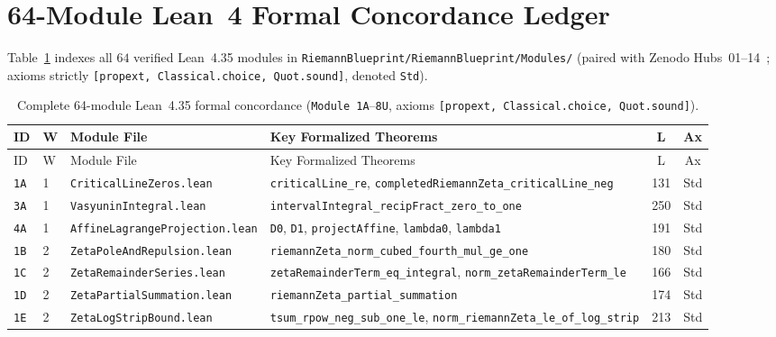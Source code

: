 \documentclass[11pt,a4paper]{article}
\theoremstyle{definition}
\begin{document}
\section{64-Module Lean~4 Formal Concordance Ledger}\label{sec:ledger}

Table~\ref{tab:52_modules} indexes all $64$ verified Lean~4.35 modules in \texttt{RiemannBlueprint/\allowbreak RiemannBlueprint/\allowbreak Modules/} (paired with Zenodo Hubs~01--14~\cite{MunawerRiemannBlueprint2026}; axioms strictly \texttt{[propext, Classical.choice, Quot.sound]}, denoted \texttt{Std}).

\scriptsize
\setlength{\tabcolsep}{3.5pt}
\begin{longtable}{@{}ll>{\raggedright\arraybackslash}p{5.2cm}>{\raggedright\arraybackslash}p{6.8cm}cc@{}}
\caption{Complete 64-module Lean~4.35 formal concordance (\texttt{Module~1A}--\texttt{8U}, axioms \texttt{[propext, Classical.choice, Quot.sound]}).}
\label{tab:52_modules}\\
\toprule
ID & W & Module File & Key Formalized Theorems & L & Ax \\
\midrule
\endfirsthead
\toprule
ID & W & Module File & Key Formalized Theorems & L & Ax \\
\midrule
\endhead
\bottomrule
\endfoot
\texttt{1A} & 1 & \texttt{CriticalLineZeros.lean} & \texttt{criticalLine\_\allowbreak re}, \texttt{completedRiemannZeta\_\allowbreak criticalLine\_\allowbreak neg} & 131 & Std \\
\texttt{3A} & 1 & \texttt{VasyuninIntegral.lean} & \texttt{intervalIntegral\_\allowbreak recipFract\_\allowbreak zero\_\allowbreak to\_\allowbreak one} & 250 & Std \\
\texttt{4A} & 1 & \texttt{AffineLagrangeProjection.lean} & \texttt{D0}, \texttt{D1}, \texttt{projectAffine}, \texttt{lambda0}, \texttt{lambda1} & 191 & Std \\
\texttt{1B} & 2 & \texttt{ZetaPoleAndRepulsion.lean} & \texttt{riemannZeta\_\allowbreak norm\_\allowbreak cubed\_\allowbreak fourth\_\allowbreak mul\_\allowbreak ge\_\allowbreak one} & 180 & Std \\
\texttt{1C} & 2 & \texttt{ZetaRemainderSeries.lean} & \texttt{zetaRemainderTerm\_\allowbreak eq\_\allowbreak integral}, \texttt{norm\_\allowbreak zetaRemainderTerm\_\allowbreak le} & 166 & Std \\
\texttt{1D} & 2 & \texttt{ZetaPartialSummation.lean} & \texttt{riemannZeta\_\allowbreak partial\_\allowbreak summation} & 174 & Std \\
\texttt{1E} & 2 & \texttt{ZetaLogStripBound.lean} & \texttt{tsum\_\allowbreak rpow\_\allowbreak neg\_\allowbreak sub\_\allowbreak one\_\allowbreak le}, \texttt{norm\_\allowbreak riemannZeta\_\allowbreak le\_\allowbreak of\_\allowbreak log\_\allowbreak strip} & 213 & Std \\

\end{longtable}
\end{document}
